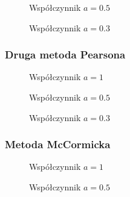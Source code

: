 \documentclass[a4paper, 10pt]{article}
\begin{document}
			
			    \begin{figure}[H]
			        \centering
			        \def \svgwidth{0.75\columnwidth}
			        
			        \caption{Współczynnik $a=0.5$}
			    \end{figure}\noindent
			
			
			    \begin{figure}[H]
			        \centering
			        \def \svgwidth{0.75\columnwidth}
			        
			        \caption{Współczynnik $a=0.3$}
			    \end{figure}\noindent
		
			\subsubsection{Druga metoda Pearsona}
			    \begin{figure}[H]
			        \centering
			        \def \svgwidth{0.75\columnwidth}
			        
			        \caption{Współczynnik $a=1$}
			    \end{figure}\noindent
			
			
			    \begin{figure}[H]
			        \centering
			        \def \svgwidth{0.75\columnwidth}
			        
			        \caption{Współczynnik $a=0.5$}
			    \end{figure}\noindent
			
			
			    \begin{figure}[H]
			        \centering
			        \def \svgwidth{0.75\columnwidth}
			        
			        \caption{Współczynnik $a=0.3$}
			    \end{figure}\noindent
		
			\subsubsection{Metoda McCormicka}
			    \begin{figure}[H]
			        \centering
			        \def \svgwidth{0.75\columnwidth}
			        
			        \caption{Współczynnik $a=1$}
			    \end{figure}\noindent
			
			
			    \begin{figure}[H]
			        \centering
			        \def \svgwidth{0.75\columnwidth}
			        
			        \caption{Współczynnik $a=0.5$}
			    \end{figure}\noindent
			
\end{document}
